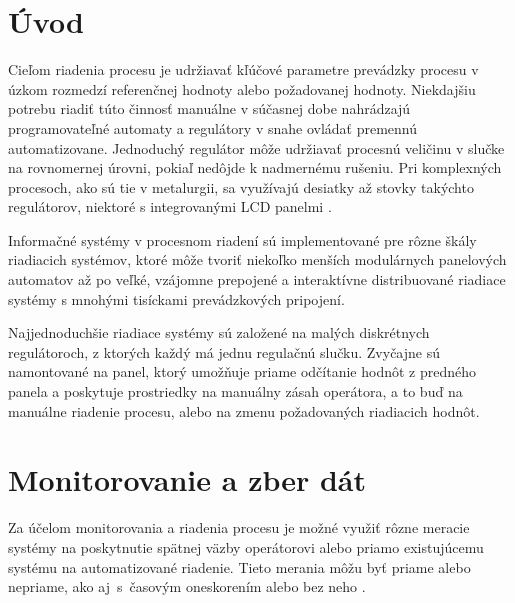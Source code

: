 \documentclass[]{tukediphc}
\begin{document}
\renewcommand\theHfigure{\theHsection.\arabic{figure}}
\renewcommand\theHtable{\theHsection.\arabic{table}}


\prvastrana


\thispagestyle{empty}
\tableofcontents
\newpage
%
%


\setcounter{page}{1}
\setcounter{equation}{0}
\setcounter{figure}{0}
\setcounter{table}{0}

\section{Úvod}

Cieľom riadenia procesu je udržiavať kľúčové parametre prevádzky procesu v úzkom rozmedzí referenčnej hodnoty alebo požadovanej hodnoty. Niekdajšiu potrebu riadiť túto činnosť manuálne v súčasnej dobe nahrádzajú programovateľné automaty a regulátory v snahe ovládať premennú automatizovane. Jednoduchý regulátor môže udržiavať procesnú veličinu v slučke na rovnomernej úrovni, pokiaľ nedôjde k nadmernému rušeniu. Pri komplexných procesoch, ako sú tie v metalurgii, sa využívajú desiatky až stovky takýchto regulátorov, niektoré s integrovanými LCD panelmi \citep{Al-Megren2016}.

Informačné systémy v procesnom riadení sú implementované pre rôzne škály riadiacich systémov, ktoré môže tvoriť niekoľko menších modulárnych panelových automatov až po veľké, vzájomne prepojené a interaktívne distribuované riadiace systémy s mnohými tisíckami prevádzkových pripojení.

Najjednoduchšie riadiace systémy sú založené na malých diskrétnych regulátoroch, z ktorých každý má jednu regulačnú slučku. Zvyčajne sú namontované na panel, ktorý umožňuje priame odčítanie hodnôt z predného panela a poskytuje prostriedky na manuálny zásah operátora, a to buď na manuálne riadenie procesu, alebo na zmenu požadovaných riadiacich hodnôt.

\section{Monitorovanie a zber dát}

Za účelom monitorovania a riadenia procesu je možné využiť rôzne meracie systémy na poskytnutie spätnej väzby operátorovi alebo priamo existujúcemu systému na automatizované riadenie. Tieto merania môžu byť priame alebo nepriame, ako aj~s~časovým oneskorením alebo bez neho \cite{Widlund1998}.
\end{document}
